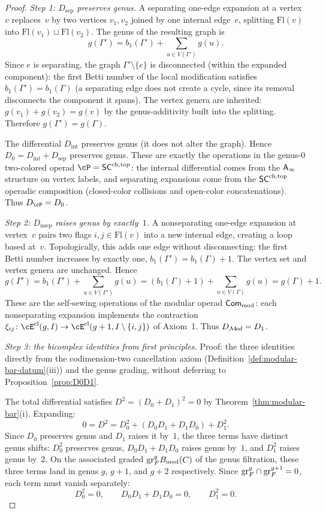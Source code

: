 \begin{proof}
\emph{Step 1: $D_{\mathrm{sep}}$ preserves genus.}
A separating one-edge expansion at a vertex~$v$ replaces~$v$
by two vertices $v_1, v_2$ joined by one internal edge~$e$,
splitting $\mathrm{Fl}(v)$ into
$\mathrm{Fl}(v_1) \sqcup \mathrm{Fl}(v_2)$.
The genus of the resulting graph is
\[
g(\Gamma') = b_1(\Gamma') + \sum_{u \in V(\Gamma')} g(u).
\]
Since $e$ is separating, the graph $\Gamma' \setminus \{e\}$ is
disconnected (within the expanded component): the first Betti
number of the local modification satisfies
$b_1(\Gamma') = b_1(\Gamma)$ (a separating edge does not create
a cycle, since its removal disconnects the component it spans).
The vertex genera are inherited:
$g(v_1) + g(v_2) = g(v)$ by the genus-additivity built into the
splitting. Therefore $g(\Gamma') = g(\Gamma)$.

The differential $D_{\mathrm{int}}$ preserves genus (it does
not alter the graph). Hence $D_0 = D_{\mathrm{int}} +
D_{\mathrm{sep}}$ preserves genus. These are exactly the
operations in the genus-$0$ two-colored operad
$\cP = \SCchtop$: the internal differential comes from the
$\mathsf{A}_{\infty}$ structure on vertex labels, and separating expansions
come from the $\mathsf{SC}^{\mathrm{ch,top}}$ operadic composition (closed-color
collisions and open-color concatenations). Thus
$D_\cP = D_0$.

\smallskip
\emph{Step 2: $D_{\mathrm{nsep}}$ raises genus by exactly~$1$.}
A nonseparating one-edge expansion at vertex~$v$ pairs two
flags $i, j \in \mathrm{Fl}(v)$ into a new internal edge,
creating a loop based at~$v$. Topologically, this adds one
edge without disconnecting: the first Betti number increases by
exactly one, $b_1(\Gamma') = b_1(\Gamma) + 1$. The vertex set
and vertex genera are unchanged. Hence
\[
g(\Gamma')
= b_1(\Gamma') + \sum_{u \in V(\Gamma')} g(u)
= (b_1(\Gamma) + 1) + \sum_{u \in V(\Gamma)} g(u)
= g(\Gamma) + 1.
\]
These are the self-sewing operations of the modular operad
$\mathsf{Com}_{\mathrm{mod}}$:
each nonseparating expansion implements the contraction
$\xi_{ij} \colon
\cE^{\mathrm{cl}}(g, I)
\to \cE^{\mathrm{cl}}(g+1, I \setminus \{i,j\})$
of Axiom~1. Thus $D_{\mathcal{M}\!od} = D_1$.

\smallskip
\emph{Step 3: the bicomplex identities from first principles.}
Proof: the three identities directly from the codimension-two
cancellation axiom (Definition~\ref{def:modular-bar-datum}(iii))
and the genus grading, without deferring to
Proposition~\ref{prop:D0D1}.

The total differential satisfies $D^2 = (D_0 + D_1)^2 = 0$ by
Theorem~\ref{thm:modular-bar}(i). Expanding:
\[
0 = D^2 = D_0^2 + (D_0 D_1 + D_1 D_0) + D_1^2.
\]
Since $D_0$ preserves genus and $D_1$ raises it by~$1$, the
three terms have distinct genus shifts: $D_0^2$ preserves genus,
$D_0 D_1 + D_1 D_0$ raises genus by~$1$, and $D_1^2$ raises
genus by~$2$. On the associated graded
$\mathrm{gr}_F^g B_{\mathrm{mod}}(C)$ of the genus filtration,
these three terms land in genus $g$, $g+1$, and $g+2$
respectively. Since $\mathrm{gr}_F^g \cap \mathrm{gr}_F^{g+1} = 0$, each term
must vanish separately:
\[
D_0^2 = 0, \qquad
D_0 D_1 + D_1 D_0 = 0, \qquad
D_1^2 = 0.
\]


\end{proof}
